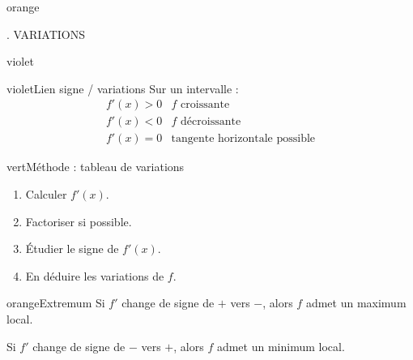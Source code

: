 \documentclass[11pt,a4paper]{article}
\newcommand{\tagcol}[2]{\begin{tcolorbox}[enhanced,colback=#1!11,colframe=#1!45!black,boxrule=0.42pt,arc=2mm,left=1mm,right=1mm,top=0.45mm,bottom=0.45mm,before skip=0mm,after skip=0.85mm,fontupper=\bfseries\scriptsize,colupper=#1!55!black]\centering #2\end{tcolorbox}}
\begin{document}
\begin{landscape}
\begin{minipage}[t]{0.242\linewidth}
\begin{panel}{orange}
\end{panel}
\end{minipage}\hfill
\begin{minipage}[t]{0.242\linewidth}
\tagcol{violet}{4. VARIATIONS}
\begin{panel}{violet}

\begin{fichebox}{violet}{Lien signe / variations}
Sur un intervalle :
\[
\begin{array}{c|c}
f'(x)>0&f\text{ croissante}\\
f'(x)<0&f\text{ décroissante}\\
f'(x)=0&\text{tangente horizontale possible}
\end{array}
\]
\end{fichebox}

\begin{fichebox}{vert}{Méthode : tableau de variations}
\begin{enumerate}[leftmargin=*,itemsep=0.1em]
\item Calculer $f'(x)$.
\item Factoriser si possible.
\item Étudier le signe de $f'(x)$.
\item En déduire les variations de $f$.
\end{enumerate}
\end{fichebox}

\begin{fichebox}{orange}{Extremum}
Si $f'$ change de signe de $+$ vers $-$, alors $f$ admet un maximum local.

Si $f'$ change de signe de $-$ vers $+$, alors $f$ admet un minimum local.
\end{fichebox}

\end{panel}
\end{minipage}

\end{landscape}
\nopagecolor
\restoregeometry
\pagestyle{fancy}
\clearpage
\end{document}
